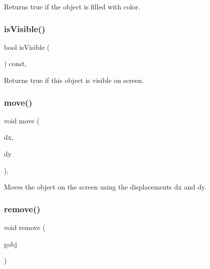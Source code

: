 Returns {\ttfamily true} if the object is filled with color. 

\mbox{\label{classGObject_a9d8a6cfb13917785c143e74d40e4e2be}} 
\subsubsection{\texorpdfstring{is\+Visible()}{isVisible()}}
{\footnotesize\ttfamily bool is\+Visible (\begin{DoxyParamCaption}{ }\end{DoxyParamCaption}) const\hspace{0.3cm}{\ttfamily [virtual]}, {\ttfamily [inherited]}}



Returns {\ttfamily true} if this object is visible on screen. 

\mbox{\label{classGObject_a5973d8dda83afb36e2c56855515be392}} 
\subsubsection{\texorpdfstring{move()}{move()}}
{\footnotesize\ttfamily void move (\begin{DoxyParamCaption}\item[{double}]{dx,  }\item[{double}]{dy }\end{DoxyParamCaption})\hspace{0.3cm}{\ttfamily [virtual]}, {\ttfamily [inherited]}}



Moves the object on the screen using the displacements {\ttfamily dx} and {\ttfamily dy}. 

\mbox{\label{classGCompound_a49dc57a2ce4caa354a5fff6acdde2e7d}} 
\subsubsection{\texorpdfstring{remove()}{remove()}\hspace{0.1cm}{\footnotesize\ttfamily [1/2]}}
{\footnotesize\ttfamily void remove (\begin{DoxyParamCaption}\item[{\mbox{\hyperlink{classGObject}{G\+Object}} $\ast$}]{gobj }\end{DoxyParamCaption})\hspace{0.3cm}{\ttfamily [virtual]}}



